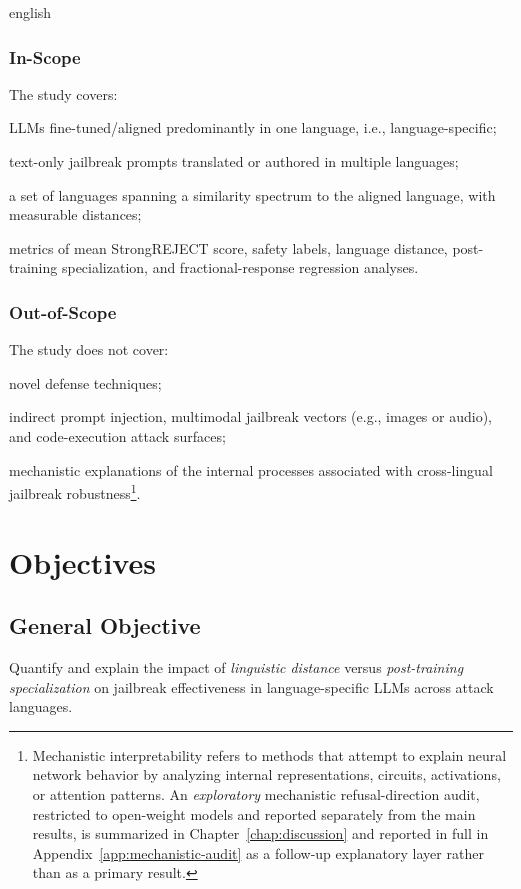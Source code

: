 \begin{otherlanguage*}{english}
\subsubsection{In-Scope}

The study covers:
\begin{alineas}
    \item LLMs fine-tuned/aligned predominantly in one language, i.e., language-specific;
    \item text-only jailbreak prompts translated or authored in multiple languages;
    \item a set of languages spanning a similarity spectrum to the aligned language, with measurable distances;
    \item metrics of mean StrongREJECT score, safety labels, language distance, post-training specialization, and fractional-response regression analyses.
\end{alineas}

\subsubsection{Out-of-Scope}
The study does not cover:
\begin{alineas}
    \item novel defense techniques;
    \item indirect prompt injection, multimodal jailbreak vectors (e.g., images or audio), and code-execution attack surfaces;
    \item mechanistic explanations of the internal processes associated with cross-lingual jailbreak robustness\footnote{Mechanistic interpretability refers to methods that attempt to explain neural network behavior by analyzing internal representations, circuits, activations, or attention patterns. An \emph{exploratory} mechanistic refusal-direction audit, restricted to open-weight models and reported separately from the main results, is summarized in Chapter~\ref{chap:discussion} and reported in full in Appendix~\ref{app:mechanistic-audit} as a follow-up explanatory layer rather than as a primary result.}.
\end{alineas}


\section{Objectives}

\subsection{General Objective}
Quantify and explain the impact of \emph{linguistic distance} versus \emph{post-training specialization} on jailbreak effectiveness in language-specific LLMs across attack languages.


\end{otherlanguage*}
